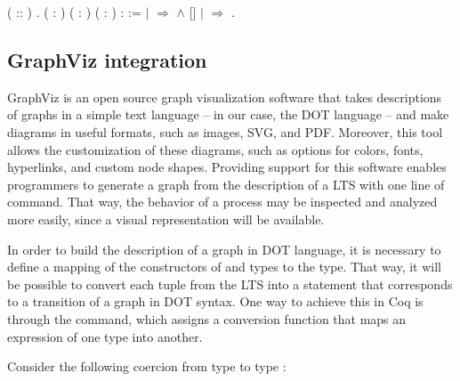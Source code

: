 \begin{coqdoccode}
	\coqdocindent{3.00em}
	   ( :: ) .\coqdoceol
	\coqdocemptyline
	\coqdocnoindent
	  ( : ) ( : ) ( :  ) :  :=\coqdoceol
	\coqdocindent{1.00em}
	    \coqdoceol
	\coqdocindent{1.00em}
	\ensuremath{|}   \ensuremath{\Rightarrow}   \ensuremath{\land}    [] \coqdoceol
	\coqdocindent{1.00em}
	\ensuremath{|}  \ensuremath{\Rightarrow} \coqdoceol
	\coqdocindent{1.00em}
	.\coqdoceol
\end{coqdoccode}

\subsection{GraphViz integration}

GraphViz is an open source graph visualization software that takes descriptions of graphs in a simple text language -- in our case, the DOT language -- and make diagrams in useful formats, such as images, SVG, and PDF. Moreover, this tool allows the customization of these diagrams, such as options for colors, fonts, hyperlinks, and custom node shapes. Providing support for this software enables \CSPcoq{} programmers to generate a graph from the description of a LTS with one line of command. That way, the behavior of a process may be inspected and analyzed more easily, since a visual representation will be available.

In order to build the description of a graph in DOT language, it is necessary to define a mapping of the constructors of  and  types to the  type. That way, it will be possible to convert each tuple from the LTS into a statement that corresponds to a transition of a graph in DOT syntax. One way to achieve this in Coq is through the  command, which assigns a conversion function that maps an expression of one type into another.

Consider the following coercion from type  to type :

